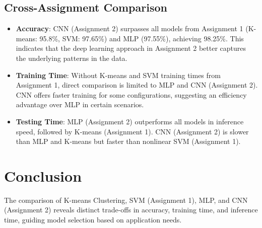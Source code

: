 \documentclass[a4paper,12pt]{article}
\begin{document}
\subsection{Cross-Assignment Comparison}
\begin{itemize}
    \item \textbf{Accuracy}: CNN (Assignment 2) surpasses all models from Assignment 1 (K-means: 95.8\%, SVM: 97.65\%) and MLP (97.55\%), achieving 98.25\%. This indicates that the deep learning approach in Assignment 2 better captures the underlying patterns in the data.
    \item \textbf{Training Time}: Without K-means and SVM training times from Assignment 1, direct comparison is limited to MLP and CNN (Assignment 2). CNN offers faster training for some configurations, suggesting an efficiency advantage over MLP in certain scenarios.
    \item \textbf{Testing Time}: MLP (Assignment 2) outperforms all models in inference speed, followed by K-means (Assignment 1). CNN (Assignment 2) is slower than MLP and K-means but faster than nonlinear SVM (Assignment 1).\\
\end{itemize}

\section{Conclusion}
The comparison of K-means Clustering, SVM (Assignment 1), MLP, and CNN (Assignment 2) reveals distinct trade-offs in accuracy, training time, and inference time, guiding model selection based on application needs.
\end{document}
